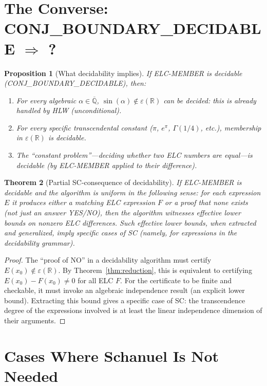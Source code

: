 \documentclass[11pt]{article}
\newtheorem{theorem}{Theorem}
\newtheorem{proposition}[theorem]{Proposition}
\begin{document}
\section{The Converse: CONJ\_BOUNDARY\_DECIDABLE $\Rightarrow$ ? }

\begin{proposition}[What decidability implies]
If ELC-MEMBER is decidable (CONJ\_BOUNDARY\_DECIDABLE), then:
\begin{enumerate}
  \item For every algebraic $\alpha\in\overline{\mathbb{Q}}$, $\sin(\alpha)\notin\varepsilon(\mathbb{R})$
    can be decided: this is already handled by HLW (unconditional).
  \item For every specific transcendental constant ($\pi$, $e^\pi$, $\Gamma(1/4)$, etc.),
    membership in $\varepsilon(\mathbb{R})$ is decidable.
  \item The ``constant problem''---deciding whether two ELC numbers are equal---is decidable
    (by ELC-MEMBER applied to their difference).
\end{enumerate}
\end{proposition}

\begin{theorem}[Partial SC-consequence of decidability]
\label{thm:converse}
If ELC-MEMBER is decidable and the algorithm is \emph{uniform} in the following sense:
for each expression $E$ it produces either a matching ELC expression $F$ or a proof
that none exists (not just an answer YES/NO), then the algorithm witnesses effective
lower bounds on nonzero ELC differences.
Such effective lower bounds, when extracted and generalized, imply specific cases of SC
(namely, for expressions in the decidability grammar).
\end{theorem}

\begin{proof}
The ``proof of NO'' in a decidability algorithm must certify $E(x_0)\notin\varepsilon(\mathbb{R})$.
By Theorem~\ref{thm:reduction}, this is equivalent to certifying $E(x_0)-F(x_0)\neq0$
for all ELC $F$. For the certificate to be finite and checkable, it must invoke
an algebraic independence result (an explicit lower bound). Extracting this bound
gives a specific case of SC: the transcendence degree of the expressions involved
is at least the linear independence dimension of their arguments.
\end{proof}

\section{Cases Where Schanuel Is Not Needed}
\end{document}
